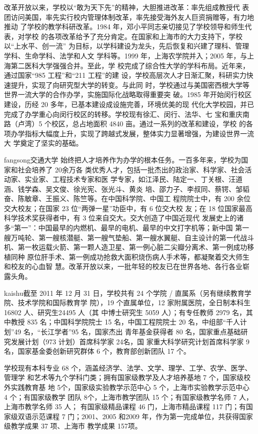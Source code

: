 {\heiti 改革开放以来，学校以“敢为天下先”的精神，大胆推进改革：率先组成教授代
  表团访问美国，率先实行校内管理体制改革，率先接受海外友人巨资捐赠等，有力地推动
  了学校的教学科研改革。1984 年，邓小平同志亲切接见了学校领导和师生代表，对学校
  的各项改革给予了充分肯定。在国家和上海市的大力支持下，学校以“上水平、创一流”
  为目标，以学科建设为龙头，先后恢复和兴建了理科、管理学科、生命学科、法学和人文
  学科等。1999 年，上海农学院并入；2005 年，与上海第二医科大学强强合并。至此，学
  校完成了综合性大学的学科布局。近年来，通过国家“985 工程”和“211 工程”的建
  设，学校高层次人才日渐汇聚，科研实力快速提升，实现了向研究型大学的转变。与此同
  时，学校通过与美国密西根大学等世界一流大学的合作办学，实施国际化战略取得重要突
  破。1985 年开始闵行校区建设，历经 20 多年，已基本建设成设施完善，环境优美的现
  代化大学校园，并已完成了办学重心向闵行校区的转移。学校现有徐汇、闵行、法华、七
  宝和重庆南路（卢湾）5 个校区，总占地面积 4840 亩。通过一系列的改革和建设，学校
  的各项办学指标大幅度上升，实现了跨越式发展，整体实力显著增强，为建设世界一流大
  学奠定了坚实的基础。}

{\ifcsname fangsong\endcsname\fangsong\else[无 \cs{fangsong} 字体。]\fi 交通大学
  始终把人才培养作为办学的根本任务。一百多年来，学校为国家和社会培养了 20余万各
  类优秀人才，包括一批杰出的政治家、科学家、社会活动家、实业家、工程技术专家和医
  学专家，如江泽民、陆定一、丁关根、汪道涵、钱学森、吴文俊、徐光宪、张光斗、黄炎
  培、邵力子、李叔同、蔡锷、邹韬奋、陈敏章、王振义、陈竺等。在中国科学院、中国工
  程院院士中，有 200 余位交大校友；在国家 23 位“两弹一星”功臣中，有 6 位交大校
  友；在 18 位国家最高科学技术奖获得者中，有 3 位来自交大。交大创造了中国近现代
  发展史上的诸多“第一”：中国最早的内燃机、最早的电机、最早的中文打字机等；新中国
  第一艘万吨轮、第一艘核潜艇、第一艘气垫船、第一艘水翼艇、自主设计的第一代战斗
  机、第一枚运载火箭、第一颗人造卫星、第一例心脏二尖瓣分离术、第一例成功移植同种
  原位肝手术、第一例成功抢救大面积烧伤病人手术等，都凝聚着交大师生和校友的心血智
  慧。改革开放以来，一批年轻的校友已在世界各地、各行各业崭露头角。}

{\ifcsname kaishu\endcsname\kaishu\else[无 \cs{kaishu} 字体。]\fi 截至 2011 年 12
  月 31 日，学校共有 24 个学院 / 直属系（另有继续教育学院、技术学院和国际教育学
  院），19 个直属单位，12 家附属医院，全日制本科生 16802 人、研究生24495 人（其
  中博士研究生 5059 人）；有专任教师 2979 名，其中教授 835 名；中国科学院院士 15
  名，中国工程院院士 20 名，中组部“千人计划”49 名，“长江学者”95 名，国家杰出
  青年基金获得者 80 名，国家重点基础研究发展计划（973 计划）首席科学家 24名，国
  家重大科学研究计划首席科学家 9名，国家基金委创新研究群体 6 个，教育部创新团队
  17 个。
  
  学校现有本科专业 68 个，涵盖经济学、法学、文学、理学、工学、农学、医学、管理学
  和艺术等九个学科门类；拥有国家级教学及人才培养基地 7 个，国家级校外实践教育基
  地 5个，国家级实验教学示范中心 5 个，上海市实验教学示范中心 4 个；有国家级教学
  团队 8个，上海市教学团队 15 个；有国家级教学名师 7 人，上海市教学名师 35 人；
  有国家级精品课程 46 门，上海市精品课程 117 门；有国家级双语示范课程 7
  门；2001、2005 和2009 年，作为第一完成单位，共获得国家级教学成果 37 项、上海市
  教学成果 157项。}
